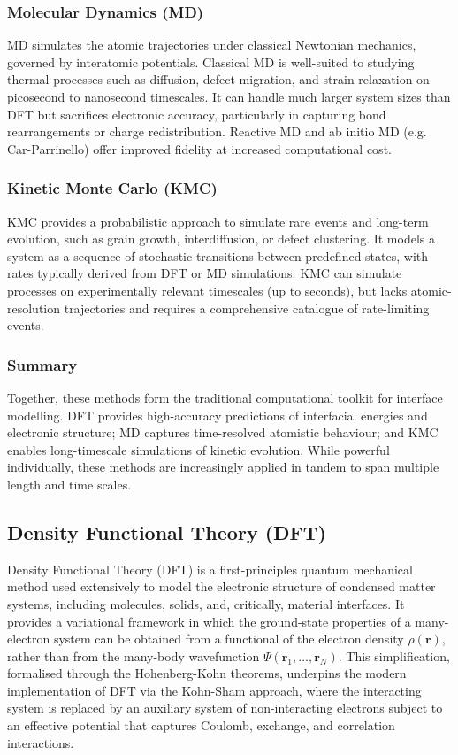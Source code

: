\subsubsection{Molecular Dynamics (MD)}

MD simulates the atomic trajectories under classical Newtonian mechanics, governed by interatomic potentials.
Classical MD is well-suited to studying thermal processes such as diffusion, defect migration, and strain relaxation
on picosecond to nanosecond timescales. It can handle much larger system sizes than DFT but sacrifices electronic
accuracy, particularly in capturing bond rearrangements or charge redistribution. Reactive MD and ab initio MD (e.g.
Car-Parrinello) offer improved fidelity at increased computational cost.

\subsubsection{Kinetic Monte Carlo (KMC)}

KMC provides a probabilistic approach to simulate rare events and long-term evolution, such as grain growth,
interdiffusion, or defect clustering. It models a system as a sequence of stochastic transitions between predefined
states, with rates typically derived from DFT or MD simulations. KMC can simulate processes on experimentally
relevant timescales (up to seconds), but lacks atomic-resolution trajectories and requires a comprehensive catalogue
of rate-limiting events.

\subsubsection{Summary}

Together, these methods form the traditional computational toolkit for interface modelling. DFT provides
high-accuracy predictions of interfacial energies and electronic structure; MD captures time-resolved atomistic
behaviour; and KMC enables long-timescale simulations of kinetic evolution. While powerful individually, these
methods are increasingly applied in tandem to span multiple length and time scales.

\subsection{Density Functional Theory (DFT)}

Density Functional Theory (DFT) is a first-principles quantum mechanical method used extensively to model the
electronic structure of condensed matter systems, including molecules, solids, and, critically, material interfaces.
It provides a variational framework in which the ground-state properties of a many-electron system can be obtained
from a functional of the electron density $\rho(\mathbf{r})$, rather than from the many-body wavefunction
$\Psi(\mathbf{r}_1, \dots, \mathbf{r}_N)$. This simplification, formalised through the Hohenberg-Kohn theorems, underpins the
modern implementation of DFT via the Kohn-Sham approach, where the interacting system is replaced by an auxiliary
system of non-interacting electrons subject to an effective potential that captures Coulomb, exchange, and correlation
interactions.

